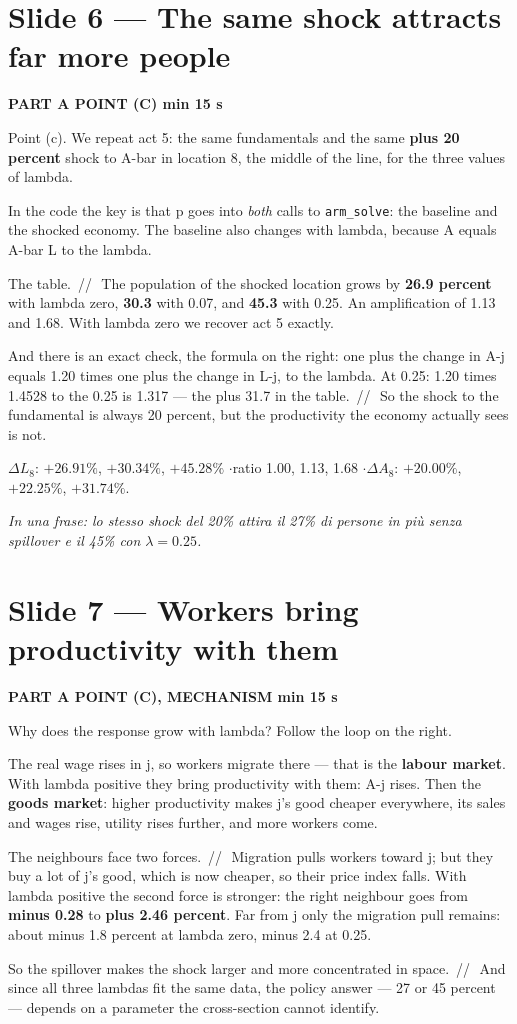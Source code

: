 \documentclass[11pt,a4paper]{article}
\newcommand{\slide}[3]{\Needspace{14\baselineskip}\section{#1}\textcolor{unicared}{\small\bfseries\MakeUppercase{#3}\quad\textperiodcentered\quad #2}\par}
\newcommand{\idea}[1]{\par{\small\itshape\color{unicablue}In una frase: #1}\par}
\newcommand{\pause}{\textcolor{unicared}{\,/\!/\,}}
\begin{document}
\slide{Slide 6 --- The same shock attracts far more people}{1 min 15 s}{Part A \textperiodcentered{} point (c)}

\begin{say}
Point (c). We repeat act 5: the same fundamentals and the same \textbf{plus 20 percent} shock to A-bar in location 8, the middle of the line, for the three values of lambda.

In the code the key is that p goes into \emph{both} calls to \texttt{arm\_solve}: the baseline and the shocked economy. The baseline also changes with lambda, because A equals A-bar L to the lambda.

The table. \pause\ The population of the shocked location grows by \textbf{26.9 percent} with lambda zero, \textbf{30.3} with 0.07, and \textbf{45.3} with 0.25. An amplification of 1.13 and 1.68. With lambda zero we recover act 5 exactly.

And there is an exact check, the formula on the right: one plus the change in A-j equals 1.20 times one plus the change in L-j, to the lambda. At 0.25: 1.20 times 1.4528 to the 0.25 is 1.317 --- the plus 31.7 in the table. \pause\ So the shock to the fundamental is always 20 percent, but the productivity the economy actually sees is not.
\end{say}

\begin{nums}
$\Delta L_8$: $+26.91\%$, $+30.34\%$, $+45.28\%$ \quad$\cdot$\quad ratio 1.00, 1.13, 1.68 \quad$\cdot$\quad $\Delta A_8$: $+20.00\%$, $+22.25\%$, $+31.74\%$.
\end{nums}
\idea{lo stesso shock del 20\% attira il 27\% di persone in più senza spillover e il 45\% con $\lambda = 0.25$.}

\slide{Slide 7 --- Workers bring productivity with them}{1 min 15 s}{Part A \textperiodcentered{} point (c), mechanism}

\begin{say}
Why does the response grow with lambda? Follow the loop on the right.

The real wage rises in j, so workers migrate there --- that is the \textbf{labour market}. With lambda positive they bring productivity with them: A-j rises. Then the \textbf{goods market}: higher productivity makes j's good cheaper everywhere, its sales and wages rise, utility rises further, and more workers come.

The neighbours face two forces. \pause\ Migration pulls workers toward j; but they buy a lot of j's good, which is now cheaper, so their price index falls. With lambda positive the second force is stronger: the right neighbour goes from \textbf{minus 0.28} to \textbf{plus 2.46 percent}. Far from j only the migration pull remains: about minus 1.8 percent at lambda zero, minus 2.4 at 0.25.

So the spillover makes the shock larger and more concentrated in space. \pause\ And since all three lambdas fit the same data, the policy answer --- 27 or 45 percent --- depends on a parameter the cross-section cannot identify.
\end{say}
\end{document}
